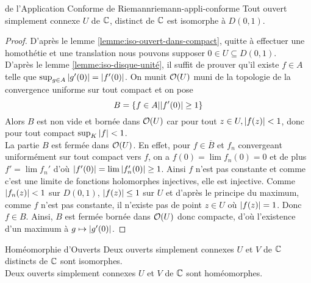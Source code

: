 \documentclass{cours}
\begin{document}
\begin{théorème}
	{de l'Application Conforme de Riemann}{riemann-appli-conforme}
	Tout ouvert simplement connexe $U$ de $\mathbb{C}$, distinct de $\mathbb{C}$ est isomorphe à $D(0, 1)$. 
\end{théorème}
\begin{proof}
	D'après le lemme \ref{lemme:iso-ouvert-dans-compact}, quitte à effectuer une homothétie et une translation nous pouvons supposer $0 \in U \subseteq D(0, 1)$.\\
	D'après le lemme \ref{lemme:iso-disque-unité}, il suffit de prouver qu'il existe $f \in A$ telle que $\sup_{g \in A}\left|g'(0)\right| = \left|f'(0)\right|$. 
	On munit $\mathcal{O}(U)$ muni de la topologie de la convergence uniforme sur tout compact et on pose
	\begin{equation*}
		B = \left\{ f \in A \middle| \left|f'(0)\right| \geq 1\right\}
	\end{equation*}
	Alors $B$ est non vide et bornée dans $\mathcal{O}(U)$ car pour tout $z \in U, \left|f(z)\right| < 1$, donc pour tout compact $\sup_{K}\left|f\right| < 1$. \\
	La partie $B$ est fermée dans $\mathcal{O}(U)$. En effet, pour $f \in \overline{B}$ et $f_{n}$ convergeant uniformément sur tout compact vers $f$, on a $f(0) = \lim f_{n}(0) = 0$ et de plus $f' = \lim f_{n}'$ d'où $\left|f'(0)\right| = \lim \left|f_{n}'(0)\right| \geq 1$. 
	Ainsi $f$ n'est pas constante et comme c'est une limite de fonctions holomorphes injectives, elle est injective. 
	Comme $\left|f_{n}(z)\right| < 1$ sur $D(0, 1)$, $\left|f(z)\right| \leq 1$ sur $U$ et d'après le principe du maximum, comme $f$ n'est pas constante, il n'existe pas de point $z \in U$ où $\left|f(z)\right| = 1$. Donc $f \in B$. 
	Ainsi, $B$ est fermée bornée dans $\mathcal{O}(U)$ donc compacte, d'où l'existence d'un maximum à $g \mapsto \left|g'(0)\right|$. 
\end{proof}

\begin{corollaire}
	{Homéomorphie d'Ouverts}{}
	Deux ouverts simplement connexes $U$ et $V$ de $\mathbb{C}$ distincts de $\mathbb{C}$ sont isomorphes.\\
	Deux ouverts simplement connexes $U$ et $V$ de $\mathbb{C}$ sont homéomorphes. 
\end{corollaire}
\end{document}
